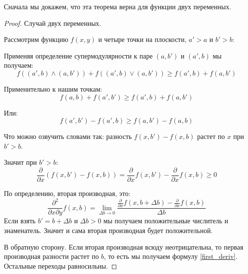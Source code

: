 Сначала мы докажем, что эта теорема верна для функции двух переменных.
\begin{proof} Случай двух переменных.

Рассмотрим функцию $ f(x,y) $ и четыре точки на плоскости, $ a'>a $ и $ b'>b $:



Применяя определение супермодулярности к паре $ (a,b') $ и $ (a',b) $ мы получаем:
\begin{equation}
f((a',b)\wedge(a,b')) + f((a',b)\vee(a,b'))\geq f(a',b) + f(a,b')
\end{equation}

Применительно к нашим точкам:
\begin{equation}
f(a,b)+f(a',b')\geq f(a',b)+f(a,b')
\end{equation}

Или:
\begin{equation}
f(a',b')-f(a',b)\geq f(a,b')-f(a,b)
\end{equation}

Что можно озвучить словами так: разность $ f(x,b')-f(x,b) $ растет по $ x $ при $ b'>b $.


Значит при $ b'>b $:
\begin{equation}\label{first_deriv}
\frac{\partial }{\partial x}(f(x,b')-f(x,b))=\frac{\partial }{\partial x}f(x,b')-\frac{\partial }{\partial x} f(x,b) \geq 0
\end{equation}

По определению, вторая производная, это:
\begin{equation}
\frac{\partial^{2}}{\partial x \partial y}f(x,b)=\lim_{\Delta b\to 0}\frac{\frac{\partial }{\partial x}f(x,b+\Delta b)-\frac{\partial }{\partial x} f(x,b)}{\Delta b}
\end{equation}
Если взять $ b'=b+\Delta b $ и $ \Delta b>0 $ мы получаем положительные числитель и знаменатель. Значит и сама вторая производная будет положительной.

В обратную сторону. Если вторая производная всюду неотрицательна, то первая производная разности растет по $ b $, то есть мы получаем формулу \ref{first_deriv}. Остальные переходы равносильны.

\end{proof}


